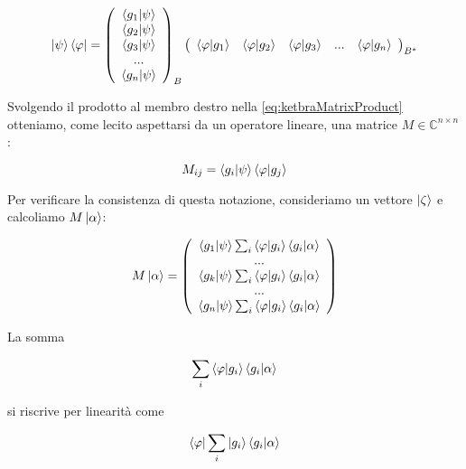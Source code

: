	\begin{equation} \label{eq:ketbraMatrixProduct}
		\ket{\psi}\bra{\varphi} =
		\left ( \begin{array}{c}
				\braket{g_1}{\psi} \\
				\braket{g_2}{\psi} \\
				\braket{g_3}{\psi} \\
				... \\
				\braket{g_n}{\psi}
			\end{array}
		\right )_B
		\left ( \begin{array}{c c c c c}
			\braket{\varphi}{g_1} & \braket{\varphi}{g_2} & \braket{\varphi}{g_3} & ... & \braket{\varphi}{g_n}
		\end{array} \right )_{B^*}
	\end{equation}

Svolgendo il prodotto al membro destro nella \eqref{eq:ketbraMatrixProduct} otteniamo, come lecito aspettarsi da un operatore lineare, una matrice $M \in \mathbb{C}^{n \times n}$:

	\begin{equation}
		M_{ij} = \braket{g_i}{\psi} \braket{\varphi}{g_j}
	\end{equation}

Per verificare la consistenza di questa notazione, consideriamo un vettore $\ket{\zeta}$ e calcoliamo $M \ket{\alpha}$:

	\begin{equation} \label{eq:matrixDer1}
		M \ket{\alpha} = \left ( \begin{array}{c}
				\braket{g_1}{\psi} \sum_i \braket{\varphi}{g_i} \braket{g_i}{\alpha} \\
				... \\
				\braket{g_k}{\psi} \sum_i \braket{\varphi}{g_i} \braket{g_i}{\alpha} \\
				... \\
				\braket{g_n}{\psi} \sum_i \braket{\varphi}{g_i} \braket{g_i}{\alpha} \\
			\end{array}
		\right )
	\end{equation}

La somma

	\begin{equation}
		\sum_i \braket{\varphi}{g_i} \braket{g_i}{\alpha}
	\end{equation}

si riscrive per linearità come

	\begin{equation} \label{eq:matrixDer2}
		\bra{\varphi} \sum_i \ket{g_i} \braket{g_i}{\alpha}
	\end{equation}

